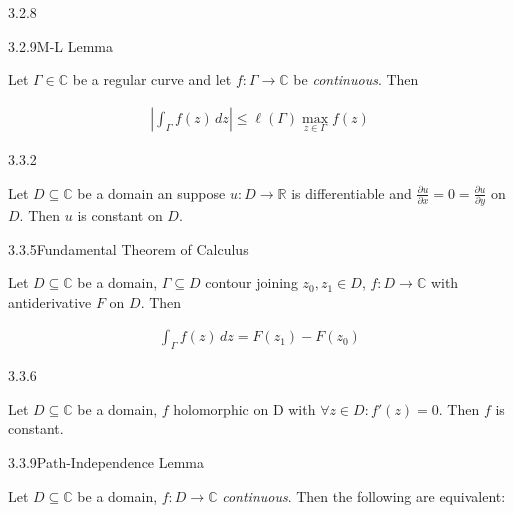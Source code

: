 \documentclass[10pt,landscape]{article}
\renewcommand{\leq}{\leqslant}
\begin{document}
\begin{multicols}{3}
\begin{lemma}{3.2.8}{}
\end{lemma}

\begin{lemma}{3.2.9}{M-L Lemma}

    Let $\Gamma \in \mathbb{C}$ be a regular curve and let $f: \Gamma \to \mathbb{C}$ be \emph{continuous}. Then

        \begin{align*}
            \left| \int_{\Gamma} f(z) \,dz \right| \leq \ell(\Gamma)\max_{z \in \Gamma}{f(z)}
        \end{align*}

\end{lemma}

\begin{lemma}{3.3.2}{}

    Let $D \subseteq \mathbb{C}$ be a domain an suppose $u: D \to \mathbb{R}$ is differentiable and $\frac{\partial u}{\partial x} = 0 = \frac{\partial u}{\partial y}$ on $D$. Then $u$ is constant on $D$.

\end{lemma}

\begin{theorem}{3.3.5}{Fundamental Theorem of Calculus}

    Let $D \subseteq \mathbb{C}$ be a domain, $\Gamma \subseteq D$ contour joining $z_0,z_1 \in D$, $f: D \to \mathbb{C}$ with antiderivative $F$ on $D$. Then

        \begin{align*}
            \int_{\Gamma} f(z) \,dz = F(z_1) - F(z_0)
        \end{align*}

\end{theorem}

\begin{corollary}{3.3.6}{}

    Let $D \subseteq \mathbb{C}$ be a domain, $f$ holomorphic on D with $\forall z \in D: f'(z) = 0$. Then $f$ is constant.

\end{corollary}

\begin{lemma}{3.3.9}{Path-Independence Lemma}

    Let $D \subseteq \mathbb{C}$ be a domain, $f: D \to \mathbb{C}$ \emph{continuous}. Then the following are equivalent:


\end{lemma}
\end{multicols}
\end{document}
